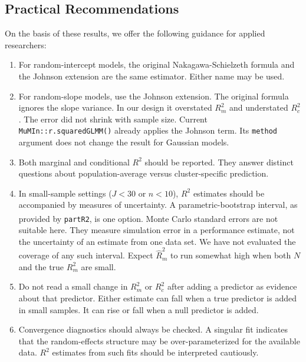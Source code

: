 \documentclass[
  11pt,
]{article}
\begin{document}
\subsection{Practical Recommendations}\label{practical-recommendations}

On the basis of these results, we offer the following guidance
for applied researchers:

\begin{enumerate}
\def\labelenumi{\arabic{enumi}.}
\item
  For random-intercept models, the original Nakagawa-Schielzeth
  formula and the Johnson extension are the same estimator.
  Either name may be used.
\item
  For random-slope models, use the Johnson extension. The
  original formula ignores the slope variance. In our design it
  overstated \(R^2_m\) and understated \(R^2_c\). The error did not
  shrink with sample size. Current \texttt{MuMIn::r.squaredGLMM()}
  already applies the Johnson term. Its \texttt{method} argument does
  not change the result for Gaussian models.
\item
  Both marginal and conditional \(R^2\) should be reported. They
  answer distinct questions about population-average versus
  cluster-specific prediction.
\item
  In small-sample settings (\(J < 30\) or \(n < 10\)), \(R^2\)
  estimates should be accompanied by measures of uncertainty. A
  parametric-bootstrap interval, as provided by \texttt{partR2}\textsuperscript{}, is one option. Monte Carlo
  standard errors are not suitable here. They measure simulation
  error in a performance estimate, not the uncertainty of an
  estimate from one data set. We have not evaluated the coverage
  of any such interval. Expect \(\hat R^2_m\) to run somewhat high
  when both \(N\) and the true \(R^2_m\) are small.
\item
  Do not read a small change in \(R^2_m\) or \(R^2_c\) after adding
  a predictor as evidence about that predictor. Either estimate
  can fall when a true predictor is added in small samples. It
  can rise or fall when a null predictor is added.
\item
  Convergence diagnostics should always be checked. A singular
  fit indicates that the random-effects structure may be
  over-parameterized for the available data. \(R^2\) estimates
  from such fits should be interpreted cautiously.
\end{enumerate}
\end{document}
